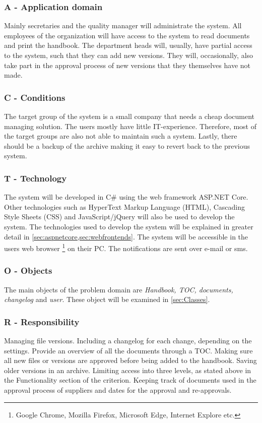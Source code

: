 \subsubsection*{A - Application domain}
Mainly secretaries and the quality manager will administrate the system.
All employees of the organization will have access to the system to read documents and print the handbook.
The department heads will, usually, have partial access to the system, such that they can add new versions.
They will, occasionally, also take part in the approval process of new versions that they themselves have not made.

\subsubsection*{C - Conditions} \label{sec:conditions}
The target group of the system is a small company that needs a cheap document managing solution.
The users mostly have little IT-experience.
Therefore, most of the target groups are also not able to maintain such a system.
Lastly, there should be a backup of the archive making it easy to revert back to the previous system.

\subsubsection*{T - Technology}
The system will be developed in C\# using the web framework ASP.NET Core.
Other technologies such as HyperText Markup Language (HTML), Cascading Style Sheets (CSS) and JavaScript/jQuery will also be used to develop the system.
The technologies used to develop the system will be explained in greater detail in \cref{sec:aspnetcore,sec:webfrontends}.
The system will be accessible in the users web browser \footnote{Google Chrome, Mozilla Firefox, Microsoft Edge, Internet Explore etc.} on their PC.
The notifications are sent over e-mail or sms.

\subsubsection*{O - Objects}
The main objects of the problem domain are \textit{Handbook, TOC, documents, changelog} and \textit{user}.
These object will be examined in \cref{sec:Classes}.

\subsubsection*{R  - Responsibility}
Managing file versions.
Including a changelog for each change, depending on the settings.
Provide an overview of all the documents through a TOC.
Making sure all new files or versions are approved before being added to the handbook.
Saving older versions in an archive.
Limiting access into three levels, as stated above in the Functionality section of the criterion.
Keeping track of documents used in the approval process of suppliers and dates for the approval and re-approvals.

